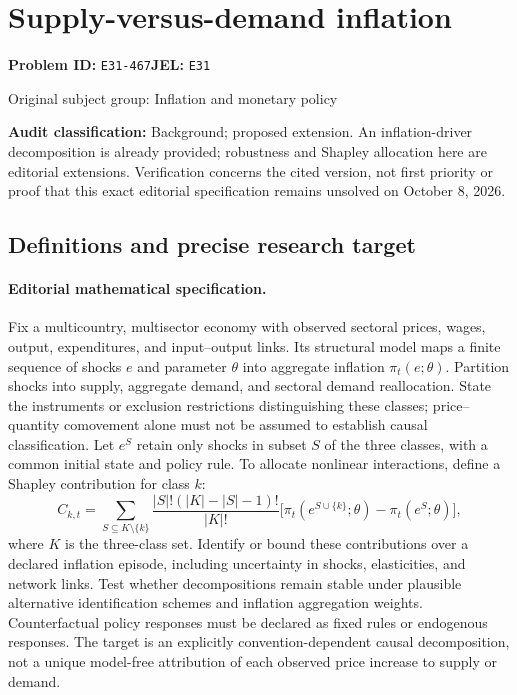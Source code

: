\documentclass[11pt,a4paper]{article}
\begin{document}
\section*{Supply-versus-demand inflation}
\textbf{Problem ID:} \texttt{E31-467}\quad \textbf{JEL:} \texttt{E31}\par
\label{problem:OP-0241}
{\sffamily\small\color{muted}Original subject group: Inflation and monetary policy\par}
\label{definitions:problem:30007522}
\textbf{Audit classification:} Background; proposed extension. An inflation-driver decomposition is already provided; robustness and Shapley allocation here are editorial extensions. Verification concerns the cited version, not first priority or proof that this exact editorial specification remains unsolved on October 8, 2026.
\subsection*{Definitions and precise research target}
\paragraph{Editorial mathematical specification.} Fix a multicountry, multisector economy with observed sectoral prices, wages, output, expenditures, and input–output links. Its structural model maps a finite sequence of shocks \(e\) and parameter \(\theta\) into aggregate inflation \(\pi_t(e;\theta)\). Partition shocks into supply, aggregate demand, and sectoral demand reallocation. State the instruments or exclusion restrictions distinguishing these classes; price–quantity comovement alone must not be assumed to establish causal classification. Let \(e^S\) retain only shocks in subset \(S\) of the three classes, with a common initial state and policy rule.
To allocate nonlinear interactions, define a Shapley contribution for class \(k\):
\[
C_{k,t}=\sum_{S\subseteq K\setminus\{k\}}
\frac{|S|!(|K|-|S|-1)!}{|K|!}
\big[\pi_t(e^{S\cup\{k\}};\theta)-\pi_t(e^S;\theta)\big],
\]
where \(K\) is the three-class set. Identify or bound these contributions over a declared inflation episode, including uncertainty in shocks, elasticities, and network links. Test whether decompositions remain stable under plausible alternative identification schemes and inflation aggregation weights. Counterfactual policy responses must be declared as fixed rules or endogenous responses. The target is an explicitly convention-dependent causal decomposition, not a unique model-free attribution of each observed price increase to supply or demand.
\end{document}
